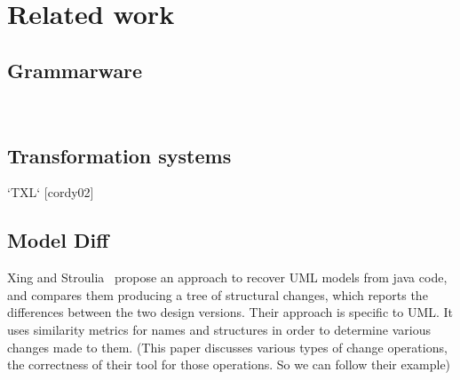 \documentclass[10pt, conference, compsocconf]{IEEEtran}
\begin{document}
{%

\section{Related work}\label{sec:related}
\subsection{Grammarware}
 
~\cite{klint05tosem}
   
\subsection{Transformation systems}

   `TXL` [cordy02]
   
\subsection{Model Diff}
Xing and Stroulia~\cite{xing05ase} propose an approach to recover UML models from java code, and compares them producing a tree of structural changes, which reports the differences between the
two design versions.  Their approach is specific to UML. It uses similarity metrics for names and structures in order to determine various changes made to them. (This paper discusses various types of change operations, the correctness of their tool for those operations. So we can follow their example)

}
\end{document}

